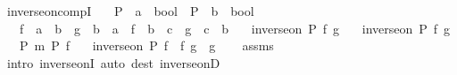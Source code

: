 \begin{isabellebody}
\endisatagproof
{\isafoldproof}%
%
\isadelimproof
\isanewline
%
\endisadelimproof
\isanewline
{}\isamarkupfalse%
\ inverse{\isacharunderscore}{\kern0pt}on{\isacharunderscore}{\kern0pt}compI{\isacharcolon}{\kern0pt}\isanewline
\ \ \ P\ {\isacharcolon}{\kern0pt}{\isacharcolon}{\kern0pt}\ {\isachardoublequoteopen}{\isacharprime}{\kern0pt}a\ {\isasymRightarrow}\ bool{\isachardoublequoteclose}\ \ P{\isacharprime}{\kern0pt}\ {\isacharcolon}{\kern0pt}{\isacharcolon}{\kern0pt}\ {\isachardoublequoteopen}{\isacharprime}{\kern0pt}b\ {\isasymRightarrow}\ bool{\isachardoublequoteclose}\isanewline
\ \ \ f\ {\isacharcolon}{\kern0pt}{\isacharcolon}{\kern0pt}\ {\isachardoublequoteopen}{\isacharprime}{\kern0pt}a\ {\isasymRightarrow}\ {\isacharprime}{\kern0pt}b{\isachardoublequoteclose}\ \ g\ {\isacharcolon}{\kern0pt}{\isacharcolon}{\kern0pt}\ {\isachardoublequoteopen}{\isacharprime}{\kern0pt}b\ {\isasymRightarrow}\ {\isacharprime}{\kern0pt}a{\isachardoublequoteclose}\ \ f{\isacharprime}{\kern0pt}\ {\isacharcolon}{\kern0pt}{\isacharcolon}{\kern0pt}\ {\isachardoublequoteopen}{\isacharprime}{\kern0pt}b\ {\isasymRightarrow}\ {\isacharprime}{\kern0pt}c{\isachardoublequoteclose}\ \ g{\isacharprime}{\kern0pt}\ {\isacharcolon}{\kern0pt}{\isacharcolon}{\kern0pt}\ {\isachardoublequoteopen}{\isacharprime}{\kern0pt}c\ {\isasymRightarrow}\ {\isacharprime}{\kern0pt}b{\isachardoublequoteclose}\isanewline
\ \ \ {\isachardoublequoteopen}inverse{\isacharunderscore}{\kern0pt}on\ P\ f\ g{\isachardoublequoteclose}\isanewline
\ \ \ {\isachardoublequoteopen}inverse{\isacharunderscore}{\kern0pt}on\ P{\isacharprime}{\kern0pt}\ f{\isacharprime}{\kern0pt}\ g{\isacharprime}{\kern0pt}{\isachardoublequoteclose}\isanewline
\ \ \ {\isachardoublequoteopen}{\isacharparenleft}{\kern0pt}{\isacharbrackleft}{\kern0pt}P{\isacharbrackright}{\kern0pt}\ {\isasymRrightarrow}\isactrlsub m\ P{\isacharprime}{\kern0pt}{\isacharparenright}{\kern0pt}\ f{\isachardoublequoteclose}\isanewline
\ \ \ {\isachardoublequoteopen}inverse{\isacharunderscore}{\kern0pt}on\ P\ {\isacharparenleft}{\kern0pt}f{\isacharprime}{\kern0pt}\ {\isasymcirc}\ f{\isacharparenright}{\kern0pt}\ {\isacharparenleft}{\kern0pt}g\ {\isasymcirc}\ g{\isacharprime}{\kern0pt}{\isacharparenright}{\kern0pt}{\isachardoublequoteclose}\isanewline
%
\isadelimproof
\ \ %
\endisadelimproof
%
\isatagproof
{}\isamarkupfalse%
\ assms\ \isamarkupfalse%
\ {\isacharparenleft}{\kern0pt}intro\ inverse{\isacharunderscore}{\kern0pt}onI{\isacharparenright}{\kern0pt}\ {\isacharparenleft}{\kern0pt}auto\ dest{\isacharbang}{\kern0pt}{\isacharcolon}{\kern0pt}\ inverse{\isacharunderscore}{\kern0pt}onD{\isacharparenright}{\kern0pt}%

\end{isabellebody}
